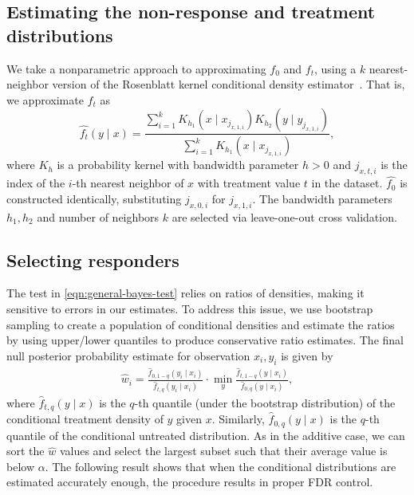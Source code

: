 \subsection{Estimating the non-response and treatment distributions}
\label{subsec:kernel_generalized:estimation}
We take a nonparametric approach to approximating $f_0$ and $f_t$, using a $k$ nearest-neighbor version of the Rosenblatt kernel conditional density estimator~\citep{holmes:etal:2007:kernel-density-estimation,rosenblatt:1969:kernel-density-estimation}. That is, we approximate $f_t$ as
\[ \hat{f_t}(y \mid x ) = \frac{\sum_{i=1}^k K_{h_1}(x \mid x_{j_{x,1,i}})K_{h_2}(y \mid y_{j_{x,1,i}})}{\sum_{i=1}^k K_{h_1}(x \mid x_{j_{x,1,i}})}, \]
where $K_h$ is a probability kernel with bandwidth parameter $h>0$ and $j_{x,t,i}$ is the index of the $i$-th nearest neighbor of $x$ with treatment value $t$ in the dataset. $\hat{f_0}$ is constructed identically, substituting $j_{x,0,i}$ for $j_{x,1,i}$. The bandwidth parameters $h_1, h_2$ and number of neighbors $k$ are selected via leave-one-out cross validation.


\subsection{Selecting responders}
\label{subsec:kernel_generalized:estimation}
The test in \cref{eqn:general-bayes-test} relies on ratios of densities, making it sensitive to errors in our estimates. To address this issue, we use bootstrap sampling to create a population of conditional densities and estimate the ratios by using upper/lower quantiles to produce conservative ratio estimates. The final null posterior probability estimate for observation $x_i, y_i$ is given by
\begin{align}
\hat{w}_i = \frac{\hat{f}_{0,1-q}(y_i \mid x_i) }{\hat{f}_{t,q}(y_i \mid x_i)} \cdot \min_{y} \frac{\hat{f}_{t,1-q}(y \mid x_i)}{\hat{f}_{0,q}(y \mid x_i)},
\label{eqn:generalized_w_estimate}
\end{align}
where $\hat{f}_{t,q}(y\mid x)$ is the $q$-th quantile (under the bootstrap distribution) of the conditional treatment density of $y$ given $x$. Similarly, $\hat{f}_{0,q}(y\mid x)$ is the $q$-th quantile of the conditional untreated distribution. As in the additive case, we can sort the $\hat{w}$ values and select the largest subset such that their average value is below $\alpha$. The following result shows that when the conditional distributions are estimated accurately enough, the procedure results in proper FDR control.

